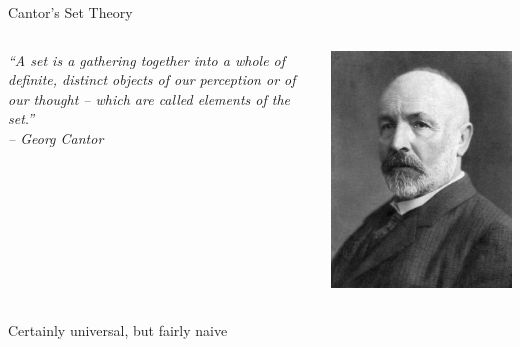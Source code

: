 \documentclass{beamer}
\begin{document}
\begin{frame}{Cantor's Set Theory}
	\begin{columns}[c,onlytextwidth]
	 \begin{column}{.70\textwidth}
		\textit{``A set is a gathering together into a whole of definite, distinct objects of our perception or of our thought -- which are called elements of the set.''\nocite{cantor_set}\\\hfill-- Georg Cantor}
	 \end{column}
	 \begin{column}{.25\textwidth}
		\includegraphics[width=\textwidth]{img/cantor.jpg}
	 \end{column}
	\end{columns}
	\vspace{\baselineskip}
	\pause
	\centerline{\alert{Certainly universal, but fairly naive}}
\end{frame}
\end{document}
